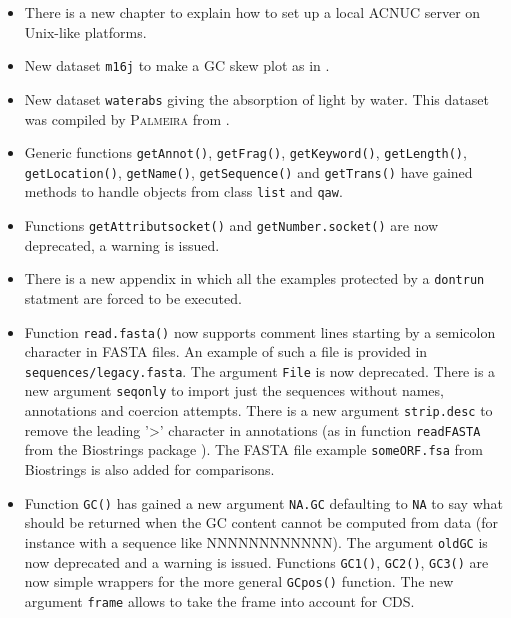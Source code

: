 \documentclass{article}
\begin{document}
\begin{itemize}

\item There is a new chapter to explain how to set up a
  local ACNUC server on Unix-like platforms.

\item New dataset \texttt{m16j} to make a GC skew plot as in
  \cite{LobryMBE96}.

\item New dataset \texttt{waterabs} giving the absorption of light
  by water. This dataset was compiled by \textsc{Palmeira} \cite{PalmeiraL2007}
  from \cite{LitjensRA1999, QuickendenTI1980}.

\item Generic functions \texttt{getAnnot()}, \texttt{getFrag()},
  \texttt{getKeyword()}, \texttt{getLength()}, \texttt{getLocation()},
  \texttt{getName()}, \texttt{getSequence()} and \texttt{getTrans()}
  have gained methods to handle objects from class \texttt{list}
  and \texttt{qaw}.

\item Functions \texttt{getAttributsocket()} and \texttt{getNumber.socket()}
  are now deprecated, a warning is issued.

\item There is a new appendix in which all the examples protected
  by a \texttt{dontrun} statment are forced to be executed.

\item Function \texttt{read.fasta()} now supports comment lines
  starting by a semicolon character in FASTA files. An example
  of such a file is provided in \texttt{sequences/legacy.fasta}.
  The argument \texttt{File} is now deprecated. There is
  a new argument \texttt{seqonly} to import just the sequences
  without names, annotations and coercion attempts. There is
  a new argument \texttt{strip.desc} to remove the leading
  '>' character in annotations (as in function \texttt{readFASTA}
  from the Biostrings package \cite{Biostrings}). The FASTA file
  example \texttt{someORF.fsa} from Biostrings is also added
  for comparisons.

\item Function \texttt{GC()} has gained a new argument \texttt{NA.GC}
  defaulting to \texttt{NA} to say what should be returned when the
  GC content cannot be computed from data (for instance with a
  sequence like NNNNNNNNNNNN). The argument \texttt{oldGC} is now
  deprecated and a warning is issued. Functions \texttt{GC1()},
  \texttt{GC2()}, \texttt{GC3()} are now simple wrappers for the
  more general \texttt{GCpos()} function. The new argument \texttt{frame}
  allows to take the frame into account for CDS.


\end{itemize}
\end{document}

